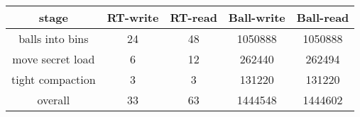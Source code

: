 \documentclass{article}
\begin{document}
\begin{center}
\begin{tabular}{||c c c c c||} 
 \hline
 stage & RT-write & RT-read & Ball-write & Ball-read \\ [0.5ex] 
 \hline\hline
 balls into bins& 24 & 48 & 1050888 & 1050888 \\ 
 \hline
 move secret load & 6 & 12 & 262440 & 262494 \\ 
 \hline
  tight compaction & 3 & 3 & 131220 & 131220 \\ 
  [0.5ex] 
 \hline\hline
 overall & 33 & 63 & 1444548 & 1444602 \\ \hline 
\end{tabular}
\end{center}
\end{document}
